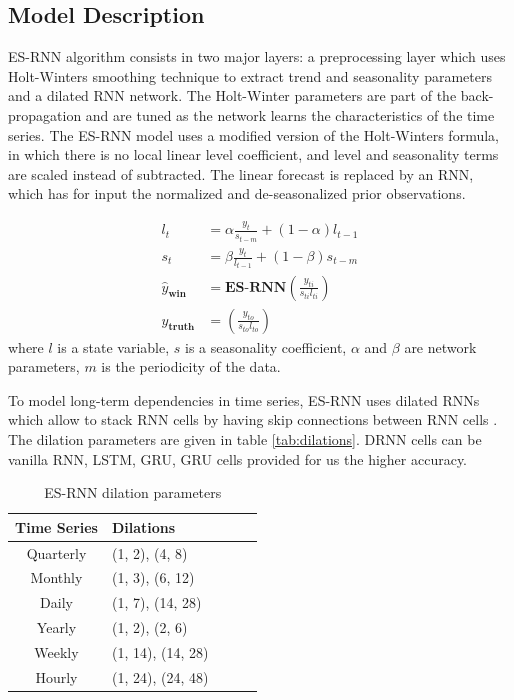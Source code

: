 \documentclass{article}
\begin{document}
\subsection{Model Description}

ES-RNN algorithm consists in two major layers: a preprocessing layer which uses Holt-Winters smoothing technique to extract trend and seasonality parameters and a dilated RNN network.
The Holt-Winter parameters are part of the back-propagation and are tuned as the network learns the characteristics of the time series. The ES-RNN model uses a modified version of the Holt-Winters formula,
in which there is no local linear level coefficient, and level and seasonality terms are scaled instead of subtracted. 
The linear forecast is replaced by an RNN, which has for input the normalized and de-seasonalized prior observations. 


\begin{align*}
	l_t 	&= \alpha \frac{y_t} {s_{t-m}} + (1-\alpha) l_{t-1} \\
	s_t 	&= \beta \frac{y_t}{l_{t-1}} + (1-\beta) s_{t-m} \\
	\hat{y}_{\textbf{win}}		&= \textbf{ES-RNN}(\frac{y_{ti}}{s_{ti} l_{ti}}) \\
	y_{\textbf{truth}}		&= (\frac{y_{to}}{s_{to} l_{to}}) 
\end{align*}
where $l$ is a state variable, $s$ is a seasonality coefficient, $\alpha$ and $\beta$ are network parameters, $m$ is the periodicity of the data.

To model long-term dependencies in time series, ES-RNN uses dilated RNNs  \cite{DBLP:journals/corr/abs-1710-02224} which allow to stack RNN cells by having skip connections between RNN cells . 
The dilation parameters  are given in table \autoref{tab:dilations}.  DRNN cells can be vanilla RNN, LSTM, GRU,  GRU cells provided for us the higher accuracy.

\begin{table}[!ht]
	\centering
	\begin{tabular}{clclc} \toprule
		\textbf{Time Series} & \textbf{Dilations} \\ 
		\midrule
		Quarterly  & (1, 2), (4, 8)	\\
		\midrule
		Monthly 	& (1, 3), (6, 12)	\\
		\midrule
		Daily 	& (1, 7), (14, 28)	\\
		\midrule		
		Yearly 	& (1, 2), (2, 6) 	\\
		\midrule		
		Weekly 	& (1, 14), (14, 28)	\\
		\midrule		
		Hourly 	& (1, 24), (24, 48)	\\
	\end{tabular}
	\caption{ES-RNN dilation parameters}
	\label{tab:dilations}
\end{table}
\end{document}

